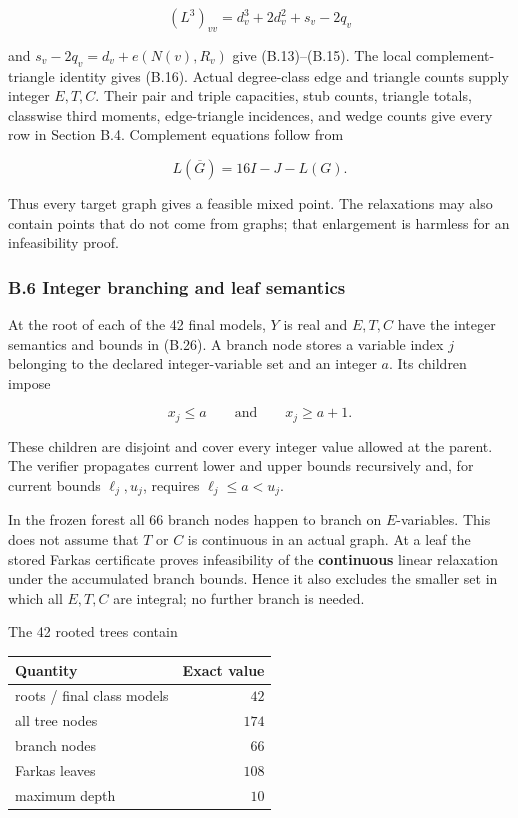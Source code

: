 \documentclass[
  english,
  11pt,
  a4paper,
]{article}
\newcounter{none} %
\begin{document}
\[
(L^3)_{vv}=d_v^3+2d_v^2+s_v-2q_v
\tag{B.41}
\]

and \(s_v-2q_v=d_v+e(N(v),R_v)\) give (B.13)--(B.15). The local
complement-triangle identity gives (B.16). Actual degree-class edge and
triangle counts supply integer \(E,T,C\). Their pair and triple
capacities, stub counts, triangle totals, classwise third moments,
edge-triangle incidences, and wedge counts give every row in Section
B.4. Complement equations follow from

\[
L(\overline G)=16I-J-L(G).
\tag{B.42}
\]

Thus every target graph gives a feasible mixed point. The relaxations
may also contain points that do not come from graphs; that enlargement
is harmless for an infeasibility proof.

\subsubsection{B.6 Integer branching and leaf
semantics}\label{b.6-integer-branching-and-leaf-semantics}

At the root of each of the 42 final models, \(Y\) is real and \(E,T,C\)
have the integer semantics and bounds in (B.26). A branch node stores a
variable index \(j\) belonging to the declared integer-variable set and
an integer \(a\). Its children impose

\[
x_j\le a
\qquad\text{and}\qquad
x_j\ge a+1.
\tag{B.43}
\]

These children are disjoint and cover every integer value allowed at the
parent. The verifier propagates current lower and upper bounds
recursively and, for current bounds \(\ell_j,u_j\), requires
\(\ell_j\le a<u_j\).

In the frozen forest all 66 branch nodes happen to branch on
\(E\)-variables. This does not assume that \(T\) or \(C\) is continuous
in an actual graph. At a leaf the stored Farkas certificate proves
infeasibility of the \textbf{continuous} linear relaxation under the
accumulated branch bounds. Hence it also excludes the smaller set in
which all \(E,T,C\) are integral; no further branch is needed.

The 42 rooted trees contain

{\def\LTcaptype{none} %
\begin{longtable}[]{@{}lr@{}}
\toprule\noalign{}
Quantity & Exact value \\
\midrule\noalign{}
\endhead
\bottomrule\noalign{}
\endlastfoot
roots / final class models & \(42\) \\
all tree nodes & \(174\) \\
branch nodes & \(66\) \\
Farkas leaves & \(108\) \\
maximum depth & \(10\) \\
\end{longtable}
}
\end{document}
